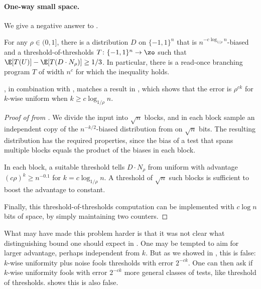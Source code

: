 \paragraph{One-way small space.}
We give a negative answer to .

\begin{corollary} \label{cor:thr-thr-const-advant} For any $\rho\in (0,1]$, there is a distribution $D$ on $\{-1,1\}^{n}$
  that is $n^{-c\log_{1/\rho} n}$-biased and a threshold-of-thresholds
$T\colon\{-1,1\}^{n}\to\zo$ such that $\E[T(U)]-\E[T(D \cdot N_\rho)] \geq 1/3$.
In particular, there is a read-once branching program $T$ of width $n^c$ for which the inequality holds.
\end{corollary}

, in combination with , matches a result in \cite{ForbesKelley-2018}, which shows that the error is $\rho^{ck}$ for $k$-wise uniform when $k \ge c\log_{1/\rho} n$.

\begin{proof}[Proof of  from ]
We divide the input into $\sqrt{n}$ blocks, and in each block sample an independent copy of the $n^{-k/2}$-biased
distribution from  on $\sqrt{n}$
bits.  The resulting distribution has the required properties, since the bias of a test that spans multiple blocks equals the product of the biases in each block.

In each block, a suitable threshold tells $D \cdot N_\rho$ from uniform with advantage $(c\rho)^k \geq n^{-0.1}$
for $k=c\log_{1/\rho} n$.  A threshold of $\sqrt{n}$
such blocks is sufficient to boost the advantage to constant.

Finally, this threshold-of-thresholds computation can be implemented with $c \log n$ bits of space, by simply maintaining two counters.
\end{proof}

What may have made this problem harder is that it was not clear what
distinguishing bound one should expect in .
One may be tempted to aim for larger advantage, perhaps independent from $k$. But as we showed in ,
this is false: $k$-wise uniformity plus noise fools thresholds
with error $2^{-ck}$. One can then ask if $k$-wise uniformity 
fools with error $2^{-ck}$ more general classes of tests, like threshold
of thresholds.  shows this is also false.

